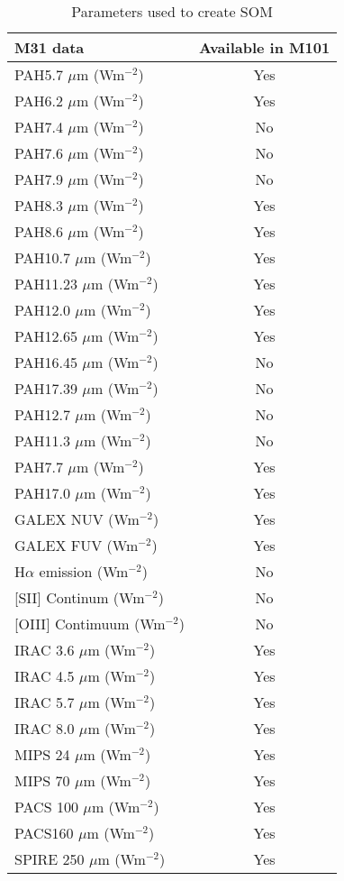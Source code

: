 \begin{table}
\centering
\caption{Parameters used to create SOM}
\label{tab: data}
\begin{tabular}{ |l|c| }
\hline\hline
M31 data           & Available in M101 \\
\hline\hline
PAH5.7 $\mu$m (Wm$^{-2}$)  & Yes \\
PAH6.2 $\mu$m (Wm$^{-2}$)  & Yes\\
PAH7.4 $\mu$m (Wm$^{-2}$)  & No \\
PAH7.6 $\mu$m (Wm$^{-2}$)  & No \\
PAH7.9 $\mu$m (Wm$^{-2}$)  & No \\
PAH8.3 $\mu$m (Wm$^{-2}$)  & Yes\\
PAH8.6 $\mu$m (Wm$^{-2}$)  & Yes\\
PAH10.7 $\mu$m (Wm$^{-2}$) & Yes\\
PAH11.23 $\mu$m (Wm$^{-2}$)& Yes\\
PAH12.0 $\mu$m (Wm$^{-2}$) & Yes\\
PAH12.65 $\mu$m (Wm$^{-2}$)& Yes\\
PAH16.45 $\mu$m (Wm$^{-2}$)& No \\
PAH17.39 $\mu$m (Wm$^{-2}$)& No \\
PAH12.7 $\mu$m (Wm$^{-2}$) & No \\
PAH11.3 $\mu$m (Wm$^{-2}$) & No \\
PAH7.7 $\mu$m (Wm$^{-2}$)  & Yes\\
PAH17.0 $\mu$m (Wm$^{-2}$) &Yes \\
GALEX NUV (Wm$^{-2}$)      & Yes\\
GALEX FUV (Wm$^{-2}$)      & Yes\\
H$\alpha$ emission (Wm$^{-2}$) & No\\
{[}SII{]} Continum (Wm$^{-2}$) & No \\
{[}OIII{]} Contimuum (Wm$^{-2}$) & No \\
IRAC 3.6 $\mu$m (Wm$^{-2}$)& Yes\\
IRAC 4.5 $\mu$m (Wm$^{-2}$)& Yes\\
IRAC 5.7 $\mu$m (Wm$^{-2}$)& Yes\\
IRAC 8.0 $\mu$m (Wm$^{-2}$)& Yes\\
MIPS 24  $\mu$m (Wm$^{-2}$)& Yes\\
MIPS 70  $\mu$m (Wm$^{-2}$)& Yes\\
PACS 100 $\mu$m (Wm$^{-2}$)& Yes\\
PACS160 $\mu$m (Wm$^{-2}$)& Yes\\
SPIRE 250 $\mu$m (Wm$^{-2}$)& Yes\\

\end{tabular}
\end{table}
